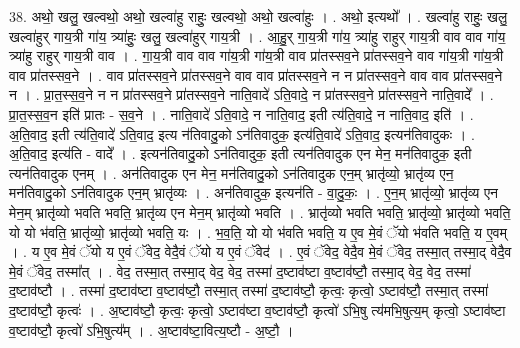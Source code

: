 \documentclass[17pt]{extarticle}
\begin{document}
38. अथो॒ खलु॒ खल्वथो॒ अथो॒ खल्वा॑हु राहुः॒ खल्वथो॒ अथो॒ खल्वा॑हुः । . अथो॒ इत्यथो᳚ । . खल्वा॑हु राहुः॒ खलु॒ खल्वा॑हुर् गाय॒त्री गा॑य॒ त्र्या॑हुः॒ खलु॒ खल्वा॑हुर् गाय॒त्री । . आ॒हु॒र् गा॒य॒त्री गा॑य॒ त्र्या॑हु राहुर् गाय॒त्री वाव वाव गा॑य॒ त्र्या॑हु राहुर् गाय॒त्री वाव । . गा॒य॒त्री वाव वाव गा॑य॒त्री गा॑य॒त्री वाव प्रा॑तस्सव॒ने प्रा॑तस्सव॒ने वाव गा॑य॒त्री गा॑य॒त्री वाव प्रा॑तस्सव॒ने । . वाव प्रा॑तस्सव॒ने प्रा॑तस्सव॒ने वाव वाव प्रा॑तस्सव॒ने न न प्रा॑तस्सव॒ने वाव वाव प्रा॑तस्सव॒ने न । . प्रा॒त॒स्स॒व॒ने न न प्रा॑तस्सव॒ने प्रा॑तस्सव॒ने नाति॒वादे॑ ऽति॒वादे॒ न प्रा॑तस्सव॒ने प्रा॑तस्सव॒ने नाति॒वादे᳚ । . प्रा॒त॒स्स॒व॒न इति॑ प्रातः - स॒व॒ने । . नाति॒वादे॑ ऽति॒वादे॒ न नाति॒वाद॒ इती त्य॑ति॒वादे॒ न नाति॒वाद॒ इति॑ । . अ॒ति॒वाद॒ इती त्य॑ति॒वादे॑ ऽति॒वाद॒ इत्य न॑तिवादु॒को ऽन॑तिवादुक॒ इत्य॑ति॒वादे॑ ऽति॒वाद॒ इत्यन॑तिवादुकः । . अ॒ति॒वाद॒ इत्य॑ति - वादे᳚ । . इत्यन॑तिवादु॒को ऽन॑तिवादुक॒ इती त्यन॑तिवादुक एन मेन॒ मन॑तिवादुक॒ इती त्यन॑तिवादुक एनम् । . अन॑तिवादुक एन मेन॒ मन॑तिवादु॒को ऽन॑तिवादुक एन॒म् भ्रातृ॑व्यो॒ भ्रातृ॑व्य एन॒ मन॑तिवादु॒को ऽन॑तिवादुक एन॒म् भ्रातृ॑व्यः । . अन॑तिवादुक॒ इत्यन॑ति - वा॒दु॒कः॒ । . ए॒न॒म् भ्रातृ॑व्यो॒ भ्रातृ॑व्य एन मेन॒म् भ्रातृ॑व्यो भवति भवति॒ भ्रातृ॑व्य एन मेन॒म् भ्रातृ॑व्यो भवति । . भ्रातृ॑व्यो भवति भवति॒ भ्रातृ॑व्यो॒ भ्रातृ॑व्यो भवति॒ यो यो भ॑वति॒ भ्रातृ॑व्यो॒ भ्रातृ॑व्यो भवति॒ यः । . भ॒व॒ति॒ यो यो भ॑वति भवति॒ य ए॒व मे॒वं ॅयो भ॑वति भवति॒ य ए॒वम् । . य ए॒व मे॒वं ॅयो य ए॒वं ॅवेद॒ वेदै॒वं ॅयो य ए॒वं ॅवेद॑ । . ए॒वं ॅवेद॒ वेदै॒व मे॒वं ॅवेद॒ तस्मा॒त् तस्मा॒द् वेदै॒व मे॒वं ॅवेद॒ तस्मा᳚त् । . वेद॒ तस्मा॒त् तस्मा॒द् वेद॒ वेद॒ तस्मा॑ द॒ष्टाव॑ष्टा व॒ष्टाव॑ष्टौ॒ तस्मा॒द् वेद॒ वेद॒ तस्मा॑ द॒ष्टाव॑ष्टौ । . तस्मा॑ द॒ष्टाव॑ष्टा व॒ष्टाव॑ष्टौ॒ तस्मा॒त् तस्मा॑ द॒ष्टाव॑ष्टौ॒ कृत्वः॒ कृत्वो॒ ऽष्टाव॑ष्टौ॒ तस्मा॒त् तस्मा॑ द॒ष्टाव॑ष्टौ॒ कृत्वः॑ । . अ॒ष्टाव॑ष्टौ॒ कृत्वः॒ कृत्वो॒ ऽष्टाव॑ष्टा व॒ष्टाव॑ष्टौ॒ कृत्वो॑ ऽभि॒षु त्य॑मभि॒षुत्य॒म् कृत्वो॒ ऽष्टाव॑ष्टा व॒ष्टाव॑ष्टौ॒ कृत्वो॑ ऽभि॒षुत्य᳚म् । . अ॒ष्टाव॑ष्टा॒वित्य॒ष्टौ - अ॒ष्टौ॒ । \newline
\pagebreak
{}
\end{document}
